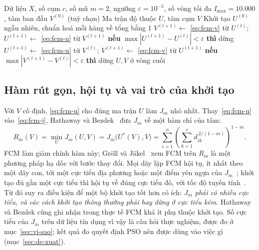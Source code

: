 \begin{algorithm}[htbp]
\caption{Fuzzy C-Means (bản cài đặt trong \texttt{fcm.py})}
\label{alg:fcm}
\begin{algorithmic}[1]
\REQUIRE Dữ liệu $X$, số cụm $c$, số mũ $m = 2$, ngưỡng $\varepsilon = 10^{-5}$, số vòng tối đa $I_{\max} = 10.000$,
  tâm ban đầu $V^{(0)}$ (tuỳ chọn)
\ENSURE Ma trận độ thuộc $U$, tâm cụm $V$
  \STATE Khởi tạo $U^{(0)}$ ngẫu nhiên, chuẩn hoá mỗi hàng về tổng bằng 1
\ENDIF
{}
    \STATE $V^{(t+1)} \leftarrow$ \eqref{eq:fcm-v} từ $U^{(t)}$; \quad $U^{(t+1)} \leftarrow$ \eqref{eq:fcm-u} từ $V^{(t+1)}$
    \STATE \textbf{nếu} $\max |U^{(t+1)} - U^{(t)}| < \varepsilon$ \textbf{thì} dừng
  \ELSE
    \STATE $U^{(t+1)} \leftarrow$ \eqref{eq:fcm-u} từ $V^{(t)}$; \quad $V^{(t+1)} \leftarrow$ \eqref{eq:fcm-v} từ $U^{(t+1)}$
    \STATE \textbf{nếu} $\max |V^{(t+1)} - V^{(t)}| < \varepsilon$ \textbf{thì} dừng
  \ENDIF
\ENDFOR
\RETURN $U, V$ ở vòng cuối
\end{algorithmic}
\end{algorithm}
\subsection{Hàm rút gọn, hội tụ và vai trò của khởi tạo}
\label{sec:fcm-khoi-tao}

Với $V$ cố định, \eqref{eq:fcm-u} cho đúng ma trận $U$ làm $J_m$ nhỏ nhất. Thay~\eqref{eq:fcm-u} vào~\eqref{eq:fcm-j},
Hathaway và Bezdek~\cite{hathaway1995reformulation} đưa $J_m$ về một hàm chỉ của tâm:
\begin{equation}
  R_m(V) = \min_{U} J_m(U, V) = J_m\big(U^{*}(V), V\big)
  = \sum_{i=1}^{n} \left( \sum_{k=1}^{c} d_{ik}^{\,2/(1-m)} \right)^{1-m}.
  \label{eq:fcm-rut-gon}
\end{equation}
FCM làm giảm chính hàm này; Gröll và Jäkel~\cite{groll2005convergence} xem FCM trên $R_m$ là một phương pháp hạ dốc với bước
thay đổi. Mọi dãy lặp FCM hội tụ, ít nhất theo một dãy con, tới một cực tiểu địa phương hoặc một điểm yên ngựa của
$J_m$~\cite{bezdek1987counterexamples}; khởi tạo đủ gần một cực tiểu thì hội tụ về đúng cực tiểu đó, với tốc độ tuyến
tính~\cite{hathaway1988recent}. Từ đó suy ra điều kiện để một bộ khởi tạo tốt hơn có ích: \emph{$J_m$ phải có nhiều cực
tiểu, và các cách khởi tạo thông thường phải hay dừng ở cực tiểu kém}. Hathaway và Bezdek cũng ghi nhận trong thực tế FCM
khá ít phụ thuộc khởi tạo. Số cực tiểu của $J_m$ trên dữ liệu tín dụng vì vậy là câu hỏi thực nghiệm, được đo ở
mục~\ref{sec:vi-sao}; kết quả đo quyết định PSO nên được dùng vào việc gì (mục~\ref{sec:de-xuat}).

